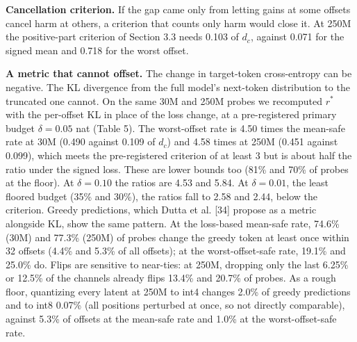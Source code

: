 \documentclass[10pt]{article}
\begin{document}
\begin{table}[t]
\centering
\caption{Effect of the horizon at 250M (post hoc): mean suffix-safe rate under the mean ($k=H'$) and worst-offset ($k=1$) criteria using the first $H'$ offsets, with the share of probes whose mean criterion is met at the grid floor. Rows marked * come from the separate $H=128$ run, whose probe positions differ.}
\end{table}

\textbf{Cancellation criterion.} If the gap came only from letting gains at some offsets cancel harm at others, a criterion that counts only harm would close it. At 250M the positive-part criterion of Section 3.3 needs 0.103 of $d_c$, against 0.071 for the signed mean and 0.718 for the worst offset.

\textbf{A metric that cannot offset.} The change in target-token cross-entropy can be negative. The KL divergence from the full model's next-token distribution to the truncated one cannot. On the same 30M and 250M probes we recomputed $r^*$ with the per-offset KL in place of the loss change, at a pre-registered primary budget $\delta=0.05$ nat (Table 5). The worst-offset rate is 4.50 times the mean-safe rate at 30M (0.490 against 0.109 of $d_c$) and 4.58 times at 250M (0.451 against 0.099), which meets the pre-registered criterion of at least 3 but is about half the ratio under the signed loss. These are lower bounds too (81\% and 70\% of probes at the floor). At $\delta=0.10$ the ratios are 4.53 and 5.84. At $\delta=0.01$, the least floored budget (35\% and 30\%), the ratios fall to 2.58 and 2.44, below the criterion. Greedy predictions, which Dutta et al. [34] propose as a metric alongside KL, show the same pattern. At the loss-based mean-safe rate, 74.6\% (30M) and 77.3\% (250M) of probes change the greedy token at least once within 32 offsets (4.4\% and 5.3\% of all offsets); at the worst-offset-safe rate, 19.1\% and 25.0\% do. Flips are sensitive to near-ties: at 250M, dropping only the last 6.25\% or 12.5\% of the channels already flips 13.4\% and 20.7\% of probes. As a rough floor, quantizing every latent at 250M to int4 changes 2.0\% of greedy predictions and to int8 0.07\% (all positions perturbed at once, so not directly comparable), against 5.3\% of offsets at the mean-safe rate and 1.0\% at the worst-offset-safe rate.
\end{document}
